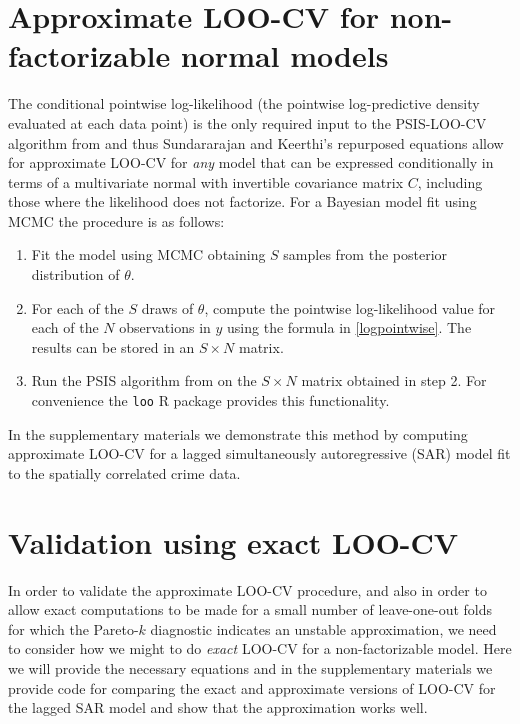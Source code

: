 \documentclass[11pt]{article}
\begin{document}
\section{Approximate LOO-CV for non-factorizable normal models}
\label{sec-approx}

The conditional pointwise log-likelihood (the pointwise log-predictive density evaluated at each data point) 
is the only required input to the PSIS-LOO-CV algorithm from \cite{vehtari2017loo} and thus 
Sundararajan and Keerthi's repurposed equations allow for approximate LOO-CV for \emph{any} 
model that can be expressed conditionally in terms of a multivariate normal with invertible covariance matrix $C$, 
including those where the likelihood does not factorize. For a Bayesian model fit using MCMC the procedure 
is as follows: 

\begin{enumerate}
\item Fit the model using MCMC obtaining $S$ samples from the posterior distribution of $\theta$.
\item For each of the $S$ draws of $\theta$, compute the pointwise log-likelihood value for each of the $N$ observations in $y$ 
using the formula in \eqref{logpointwise}. The results can be stored in an $S \times N$ matrix. 
\item Run the PSIS algorithm from \cite{vehtari2017loo} on the $S \times N$ matrix obtained in step 2. 
For convenience the \texttt{loo} R package \citep{loo2018} provides this functionality.
\end{enumerate}

In the supplementary materials we demonstrate this method by computing approximate  
LOO-CV for a lagged simultaneously autoregressive (SAR) model fit to the spatially 
correlated crime data.

\section{Validation using exact LOO-CV}

In order to validate the approximate LOO-CV procedure, and also in order to allow
exact computations to be made for a small number of leave-one-out folds for
which the Pareto-$k$ diagnostic \citep{vehtari2017psis} indicates an unstable
approximation, we need to consider how we might to do \emph{exact} LOO-CV
for a non-factorizable model. Here we will provide the necessary equations and 
in the supplementary materials we provide code for comparing the exact and 
approximate versions of LOO-CV for the lagged SAR model and show that the 
approximation works well.
\end{document}
